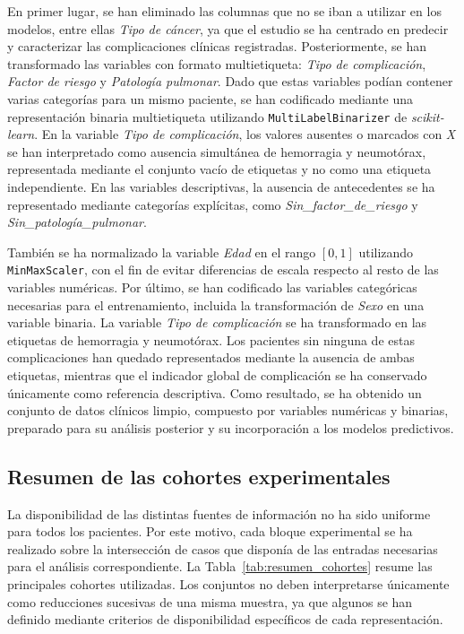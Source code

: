 En primer lugar, se han eliminado las columnas que no se iban a utilizar en los modelos, entre ellas \textit{Tipo de cáncer}, ya que el estudio se ha centrado en predecir y caracterizar las complicaciones clínicas registradas. Posteriormente, se han transformado las variables con formato multietiqueta: \textit{Tipo de complicación}, \textit{Factor de riesgo} y \textit{Patología pulmonar}. Dado que estas variables podían contener varias categorías para un mismo paciente, se han codificado mediante una representación binaria multietiqueta utilizando \texttt{MultiLabelBinarizer} de \textit{scikit-learn}. En la variable \textit{Tipo de complicación}, los valores ausentes o marcados con \textit{X} se han interpretado como ausencia simultánea de hemorragia y neumotórax, representada mediante el conjunto vacío de etiquetas y no como una etiqueta independiente. En las variables descriptivas, la ausencia de antecedentes se ha representado mediante categorías explícitas, como \textit{Sin\_factor\_de\_riesgo} y \textit{Sin\_patología\_pulmonar}.

También se ha normalizado la variable \textit{Edad} en el rango $[0,1]$ utilizando \texttt{MinMaxScaler}, con el fin de evitar diferencias de escala respecto al resto de las variables numéricas. Por último, se han codificado las variables categóricas necesarias para el entrenamiento, incluida la transformación de \textit{Sexo} en una variable binaria. La variable \textit{Tipo de complicación} se ha transformado en las etiquetas de hemorragia y neumotórax. Los pacientes sin ninguna de estas complicaciones han quedado representados mediante la ausencia de ambas etiquetas, mientras que el indicador global de complicación se ha conservado únicamente como referencia descriptiva. Como resultado, se ha obtenido un conjunto de datos clínicos limpio, compuesto por variables numéricas y binarias, preparado para su análisis posterior y su incorporación a los modelos predictivos.

\subsection{Resumen de las cohortes experimentales}
\label{subsec:resumen_cohortes}

La disponibilidad de las distintas fuentes de información no ha sido uniforme para todos los pacientes. Por este motivo, cada bloque experimental se ha realizado sobre la intersección de casos que disponía de las entradas necesarias para el análisis correspondiente. La Tabla~\ref{tab:resumen_cohortes} resume las principales cohortes utilizadas. Los conjuntos no deben interpretarse únicamente como reducciones sucesivas de una misma muestra, ya que algunos se han definido mediante criterios de disponibilidad específicos de cada representación.

